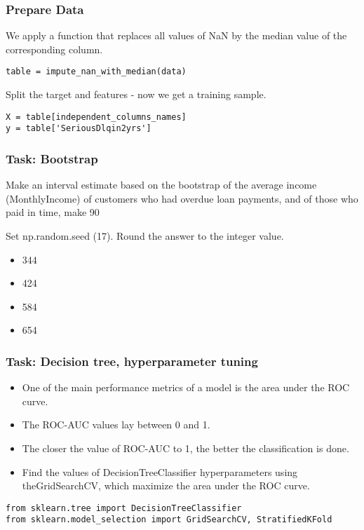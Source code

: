 \begin{frame}[fragile]\frametitle{Prepare Data}
We apply a function that replaces all values of NaN by the median value of the corresponding column.

\begin{lstlisting}
table = impute_nan_with_median(data)
\end{lstlisting}
Split the target and features - now we get a training sample.
\begin{lstlisting}
X = table[independent_columns_names]
y = table['SeriousDlqin2yrs']
\end{lstlisting}
\end{frame}

\begin{frame}[fragile]\frametitle{Task: Bootstrap}
Make an interval estimate based on the bootstrap of the average income (MonthlyIncome) of customers who had overdue loan payments, and of those who paid in time, make 90%

Set np.random.seed (17). Round the answer to the integer value.

\begin{itemize}
\item 344
\item 424
\item 584
\item 654
\end{itemize}

\end{frame}

\begin{frame}[fragile]\frametitle{Task: Decision tree, hyperparameter tuning}
\begin{itemize}
\item One of the main performance metrics of a model is the area under the ROC curve. 
\item The ROC-AUC values lay between 0 and 1. 
\item The closer the value of ROC-AUC to 1, the better the classification is done.
\item Find the values of DecisionTreeClassifier hyperparameters using theGridSearchCV, which maximize the area under the ROC curve.
\end{itemize}


\begin{lstlisting}
from sklearn.tree import DecisionTreeClassifier
from sklearn.model_selection import GridSearchCV, StratifiedKFold
\end{lstlisting}
\end{frame}


